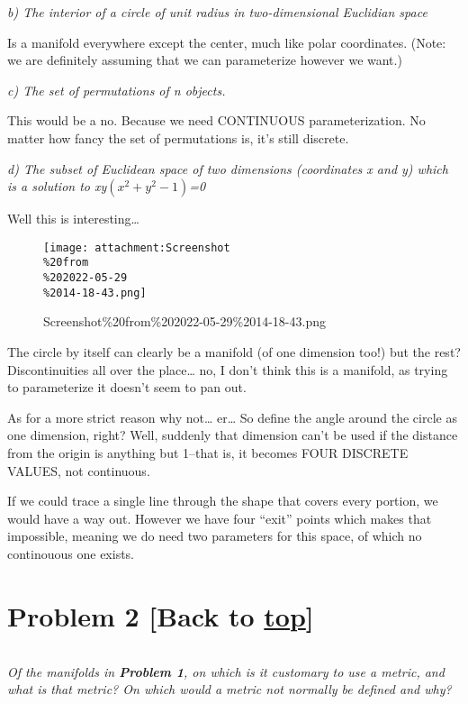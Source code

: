 \documentclass[landscape,letterpaper,10pt,english]{article}
\begin{document}
    \emph{b) The interior of a circle of unit radius in two-dimensional
Euclidian space}

Is a manifold everywhere except the center, much like polar coordinates.
(Note: we are definitely assuming that we can parameterize however we
want.)

    \emph{c) The set of permutations of n objects.}

This would be a no. Because we need CONTINUOUS parameterization. No
matter how fancy the set of permutations is, it's still discrete.

    \emph{d) The subset of Euclidean space of two dimensions (coordinates x
and y) which is a solution to xy\((x^2+y^2-1)\)=0}

Well this is interesting\ldots{}

\begin{figure}
\centering
\texttt{[image: attachment:Screenshot\\\%20from\\\%202022-05-29\\\%2014-18-43.png]}
\caption{Screenshot\%20from\%202022-05-29\%2014-18-43.png}
\end{figure}

    The circle by itself can clearly be a manifold (of one dimension too!)
but the rest? Discontinuities all over the place\ldots{} no, I don't
think this is a manifold, as trying to parameterize it doesn't seem to
pan out.

As for a more strict reason why not\ldots{} er\ldots{} So define the
angle around the circle as one dimension, right? Well, suddenly that
dimension can't be used if the distance from the origin is anything but
1--that is, it becomes FOUR DISCRETE VALUES, not continuous.

If we could trace a single line through the shape that covers every
portion, we would have a way out. However we have four ``exit'' points
which makes that impossible, meaning we do need two parameters for this
space, of which no continouous one exists.

    \hypertarget{problem-2-back-to-top}{%
\section{\texorpdfstring{Problem 2 {[}Back to
\hyperref[toc]{top}{]}}{Problem 2 {[}Back to {]}}}\label{problem-2-back-to-top}}

\[\label{P2}\]

\emph{Of the manifolds in \textbf{Problem 1}, on which is it customary
to use a metric, and what is that metric? On which would a metric not
normally be defined and why?}
\end{document}
